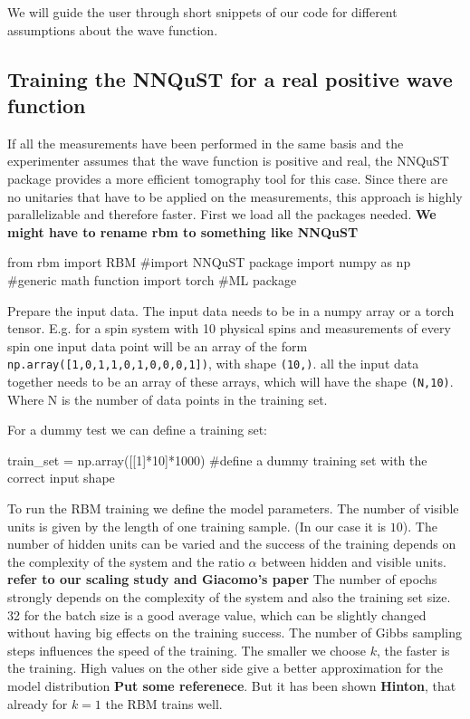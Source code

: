 \documentclass[a4paper]{article}
\begin{document}
We will guide the user through short snippets of our code for different assumptions about the wave function.

\subsection{Training the NNQuST for a real positive wave function}

If all the measurements have been performed in the same basis and the experimenter assumes that the wave function is positive and real, the NNQuST package provides a more efficient tomography tool for this case. Since there are no unitaries that have to be applied on the measurements, this approach is highly parallelizable  and therefore faster.
First we load all the packages needed. \textbf{We might have to rename rbm to something like NNQuST} 

\begin{python}
from rbm import RBM #import NNQuST package
import numpy as np #generic math function
import torch #ML package
\end{python}

Prepare the input data. The input data needs to be in a numpy array or a torch tensor. E.g. for a spin system with 10 physical spins and measurements of every spin one input data point will be an array of the form \verb|np.array([1,0,1,1,0,1,0,0,0,1])|, with shape \verb|(10,)|. all the input data together needs to be an array of these arrays, which will have the shape \verb|(N,10)|. Where N is the number of data points in the training set.

For a dummy test we can define a training set:

\begin{python}
train_set = np.array([[1]*10]*1000) #define a dummy training set with the correct input shape
\end{python}

To run the RBM training we define the model parameters. The number of visible units is given by the length of one training sample. (In our case it is $10$). 
The number of hidden units can be varied and the success of the training depends on the complexity of the system and the ratio $\alpha$ between hidden and visible units. 
\textbf{refer to our scaling study and Giacomo's paper} 
The number of epochs strongly depends on the complexity of the system and also the training set size. 32 for the batch size is a good average value, which can be slightly changed without having big effects on the training success. The number of Gibbs sampling steps influences the speed of the training. The smaller we choose $k$, the faster is the training. High values on the other side give a better approximation for the model distribution \textbf{Put some referenece}. But it has been shown \textbf{Hinton}, that already for $k=1$ the RBM trains well.
\end{document}
